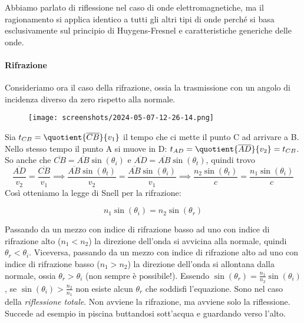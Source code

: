 \begin{note}
	Abbiamo parlato di riflessione nel caso di onde elettromagnetiche, ma il ragionamento si applica identico a tutti gli altri tipi di onde perché si basa esclusivamente sul principio di Huygens-Fresnel e caratteristiche generiche delle onde.
\end{note}

\paragraph{Rifrazione}
Consideriamo ora il caso della rifrazione, ossia la trasmissione con un angolo di incidenza diverso da zero rispetto alla normale.
\begin{figure}[H]
	\centering
	\texttt{[image: screenshots/2024-05-07-12-26-14.png]}
\end{figure}
Sia \(t_{CB} = \quotient{\overline{CB} }{v_1} \) il tempo che ci mette il punto C ad arrivare a B. Nello stesso tempo il punto A si muove in D: \(t_{AD} = \quotient{\overline{AD} }{v_2} = t_{CB} \). So anche che \(\overline{CB} = \overline{AB} \sin (\theta _i)\) e \(\overline{AD} = \overline{AB} \sin (\theta _t)\), quindi trovo
\begin{equation}
	\frac{\overline{AD} }{v_2} = \frac{\overline{CB} }{v_1}
	\implies \frac{\overline{AB} \sin (\theta _t)}{v_2} = \frac{\overline{AB} \sin (\theta _i)}{v_1}
	\implies \frac{n_2 \sin (\theta _t)}{c} = \frac{n_1 \sin (\theta _i)}{c}
\end{equation}
Così otteniamo la legge di Snell per la rifrazione:
\begin{formula}
	\begin{equation}
		n_1 \sin (\theta _i) = n_2 \sin (\theta _r)
	\end{equation}
\end{formula}
Passando da un mezzo con indice di rifrazione basso ad uno con indice di rifrazione alto (\(n_1 < n_2\)) la direzione dell'onda si avvicina alla normale, quindi \(\theta _r < \theta _i\). Viceversa, passando da un mezzo con indice di rifrazione alto ad uno con indice di rifrazione basso (\(n_1 > n_2\)) la direzione dell'onda si allontana dalla normale, ossia \(\theta _r > \theta _i\) (non sempre è possibile!). Essendo \(\sin (\theta _r) = \frac{n_1}{n_2} \sin (\theta _i)\), se \(\sin (\theta _i)> \frac{n_2}{n_1}\) non esiste alcun \(\theta _r\) che soddisfi l'equazione. Sono nel caso della \emph{riflessione totale}. Non avviene la rifrazione, ma avviene solo la riflessione. Succede ad esempio in piscina buttandosi sott'acqua e guardando verso l'alto.

